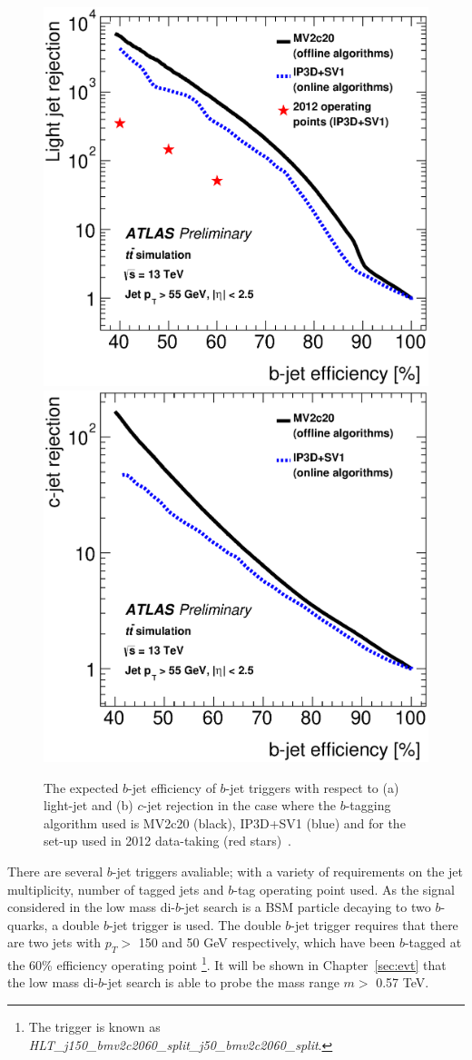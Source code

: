 \begin{figure}[!ht]
  \begin{center}
    \includegraphics[width=0.48\linewidth, angle=0]{figs/Trigger/trig-bTrig_perf_light.eps}
    \includegraphics[width=0.48\linewidth, angle=0]{figs/Trigger/trig-bTrig_perf_charm.eps}
  \end{center}
  \caption[The expected $b$-jet efficiency of $b$-jet triggers in Run-2 compared to the set-up used in 2012 data-taking.]
    {The expected $b$-jet efficiency of $b$-jet triggers with respect to (a) light-jet and (b) $c$-jet rejection
    in the case where the $b$-tagging algorithm used is MV2c20 (black), IP3D+SV1 (blue) and for the set-up used in 2012 data-taking (red stars)~\cite{trig-bTrig_desc}.}
  \label{fig:trig-bTrig_perf}
\end{figure}

\newpage
There are several $b$-jet triggers avaliable;
with a variety of requirements on the jet multiplicity, number of tagged jets and $b$-tag operating point used.
As the signal considered in the low mass di-$b$-jet search is a BSM particle decaying to two $b$-quarks, a double $b$-jet trigger is used.
The double $b$-jet trigger requires that there are two jets with $p_T >$ 150 and 50 GeV respectively,
which have been $b$-tagged at the 60\% efficiency operating point \footnote{The trigger is known as \textit{HLT\_j150\_bmv2c2060\_split\_j50\_bmv2c2060\_split}.}.
It will be shown in Chapter~\ref{sec:evt} that the low mass di-$b$-jet search is able to probe the mass range $m >$ 0.57 TeV.

